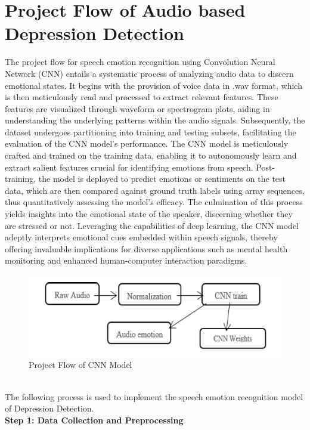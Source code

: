 \section{Project Flow of Audio based Depression Detection}
The project flow for speech emotion recognition using Convolution Neural Network (CNN) entails a systematic process of analyzing audio data to discern emotional states. It begins with the provision of voice data in .wav format, which is then meticulously read and processed to extract relevant features. These features are visualized through waveform or spectrogram plots, aiding in understanding the underlying patterns within the audio signals. Subsequently, the dataset undergoes partitioning into training and testing subsets, facilitating the evaluation of the CNN model's performance. The CNN model is meticulously crafted and trained on the training data, enabling it to autonomously learn and extract salient features crucial for identifying emotions from speech. Post-training, the model is deployed to predict emotions or sentiments on the test data, which are then compared against ground truth labels using array sequences, thus quantitatively assessing the model's efficacy. The culmination of this process yields insights into the emotional state of the speaker, discerning whether they are stressed or not. Leveraging the capabilities of deep learning, the CNN model adeptly interprets emotional cues embedded within speech signals, thereby offering invaluable implications for diverse applications such as mental health monitoring and enhanced human-computer interaction paradigms.
\\
 \begin{figure}[hbt!]
  \centering
 \includegraphics[width=0.8\linewidth]{C_chap/fig36.png}
     \caption{Project Flow of CNN Model}
\end{figure}
\\
The following process is used to implement the speech emotion recognition model of Depression Detection.
\\
\textbf{Step 1: Data Collection and Preprocessing}
\\
